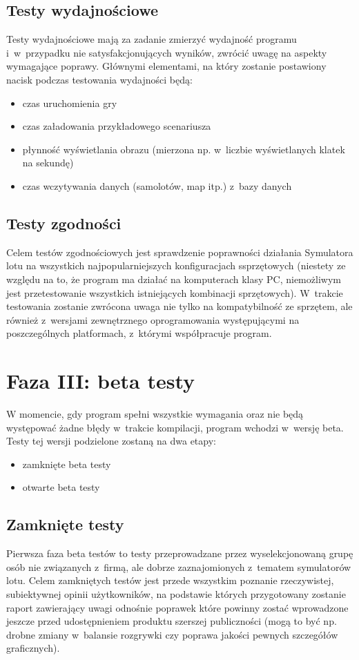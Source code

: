 \documentclass{mwrep}
\begin{document}
\section{Testy wydajnościowe}
Testy wydajnościowe mają za zadanie zmierzyć wydajność programu i~w~przypadku nie satysfakcjonujących wyników, zwrócić uwagę na \linebreak aspekty wymagające poprawy. Głównymi elementami, na który zostanie postawiony nacisk podczas testowania wydajności będą:
\begin{itemize}
\item czas uruchomienia gry
\item czas załadowania przykładowego scenariusza
\item płynność wyświetlania obrazu (mierzona np. w~liczbie wyświetlanych klatek na sekundę)
\item czas wczytywania danych (samolotów, map itp.) z~bazy danych
\end{itemize}

\section{Testy zgodności}
Celem testów zgodnościowych jest sprawdzenie poprawności działania Symulatora lotu na wszystkich najpopularniejszych konfiguracjach \linebreak ssprzętowych (niestety ze względu na to, że program ma działać na komputerach klasy PC, niemożliwym jest przetestowanie wszystkich istniejących kombinacji sprzętowych). W~trakcie testowania zostanie zwrócona uwaga nie tylko na kompatybilność ze sprzętem, ale również z~wersjami zewnętrznego oprogramowania występującymi na poszczególnych platformach, z~którymi współpracuje program.

\chapter{Faza III: beta testy}
W momencie, gdy program spełni wszystkie wymagania oraz nie będą występować żadne błędy w~trakcie kompilacji, program wchodzi w~wersję beta. Testy tej wersji podzielone zostaną na dwa etapy:
\begin{itemize}
\item zamknięte beta testy
\item otwarte beta testy
\end{itemize}

\section{Zamknięte testy}
Pierwsza faza beta testów to testy przeprowadzane przez wyselekcjonowaną grupę osób nie związanych z~firmą, ale dobrze zaznajomionych z~tematem symulatorów lotu. Celem zamkniętych testów jest przede wszystkim poznanie rzeczywistej, subiektywnej opinii użytkowników, na podstawie których przygotowany zostanie raport zawierający uwagi odnośnie poprawek które powinny zostać wprowadzone jeszcze przed udostępnieniem produktu szerszej publiczności (mogą to być np. drobne zmiany w~balansie rozgrywki czy poprawa jakości pewnych szczegółów graficznych).
\end{document}

